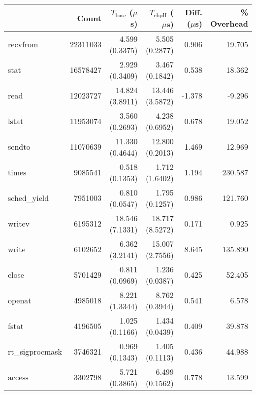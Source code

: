 \begin{tabular}{>{\ttfamily}lrrrrr}
\toprule
\multicolumn{1}{l}{System Call} &     Count & $T_\text{base}$ ($\mu$s) & $T_\text{ebpH}$ ($\mu$s) &  Diff. ($\mu$s) &  \% Overhead \\
\midrule
                       recvfrom &  22311033 &           4.599 (0.3375) &           5.505 (0.2877) &           0.906 &       19.705 \\
                           stat &  16578427 &           2.929 (0.3409) &           3.467 (0.1842) &           0.538 &       18.362 \\
                           read &  12023727 &          14.824 (3.8911) &          13.446 (3.5872) &          -1.378 &       -9.296 \\
                          lstat &  11953074 &           3.560 (0.2693) &           4.238 (0.6952) &           0.678 &       19.052 \\
                         sendto &  11070639 &          11.330 (0.4644) &          12.800 (0.2013) &           1.469 &       12.969 \\
                          times &   9085541 &           0.518 (0.1353) &           1.712 (1.6402) &           1.194 &      230.587 \\
                   sched\_yield &   7951003 &           0.810 (0.0547) &           1.795 (0.1257) &           0.986 &      121.760 \\
                         writev &   6195312 &          18.546 (7.1331) &          18.717 (8.5272) &           0.171 &        0.925 \\
                          write &   6102652 &           6.362 (3.2141) &          15.007 (2.7556) &           8.645 &      135.890 \\
                          close &   5701429 &           0.811 (0.0969) &           1.236 (0.0387) &           0.425 &       52.405 \\
                         openat &   4985018 &           8.221 (1.3344) &           8.762 (0.3944) &           0.541 &        6.578 \\
                          fstat &   4196505 &           1.025 (0.1166) &           1.434 (0.0439) &           0.409 &       39.878 \\
                rt\_sigprocmask &   3746321 &           0.969 (0.1343) &           1.405 (0.1113) &           0.436 &       44.988 \\
                         access &   3302798 &           5.721 (0.3865) &           6.499 (0.1562) &           0.778 &       13.599 \\

\end{tabular}

